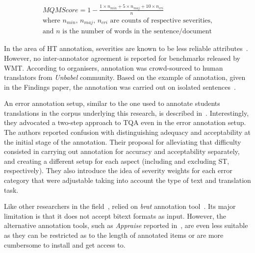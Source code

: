 
\begin{equation}\label{eq:mqm_score}
\begin{split}
MQM Score = 1 - \frac{1\times n_{min} + 5\times n_{maj} + 10\times n_{cri}}{n} \\
\text{where $n_{min}$, $n_{maj}$, $n_{cri}$ are counts of respective severities,} \\
\text{and $n$ is the number of words in the sentence/document}
\end{split}
\end{equation}

In the area of HT annotation, severities are known to be less reliable attributes~\cite[p.33]{HuertasBarros2018}. However, no inter-annotator agreement is reported for benchmarks released by WMT. According to organisers, annotation was crowd-sourced to human translators from \textit{Unbabel} community. Based on the example of annotation, given in the Findings paper, the annotation was carried out on isolated sentences~\cite[p.3]{Fonseca2019}. 

\label{pg:daems_two-stage_errorann}
An error annotation setup, similar to the one used to annotate students translations in the corpus underlying this research, is described in~\citet{Daems2013, Daems2017}. Interestingly, they advocated a two-step approach to \gls*{TQA} even in the error annotation setup. The authors reported confusion with distinguishing adequacy and acceptability at the initial stage of the annotation. Their proposal for alleviating that difficulty consisted in carrying out annotation for accuracy and acceptability separately, and creating a different setup for each aspect (including and excluding ST, respectively). 
They also introduce the idea of severity weights for each error category that were adjustable taking into account the type of text and translation task.

Like other researchers in the field~\cite{Kubler2018,Verplaetse2019}, \citet{Daems2017} relied on \textit{brat} annotation tool~\cite{Stenetorp2012}. Its major limitation is that it does not accept bitext formats as input. 
However, the alternative annotation tools, such as \textit{Appraise} reported in~\citet{Federmann2010}, are even less suitable as they can be restricted as to the length of annotated items or are more cumbersome to install and get access to.

